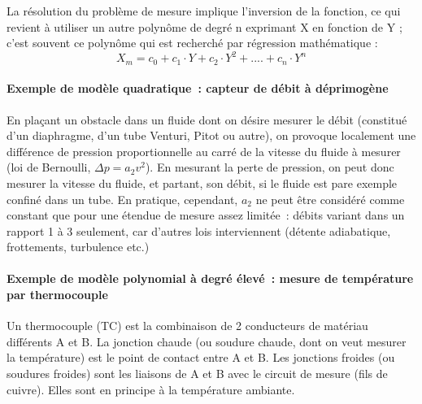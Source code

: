 La résolution du problème de mesure implique l'inversion de la fonction, ce qui revient à utiliser un autre polynôme de degré n exprimant X en fonction de Y ; c'est souvent ce polynôme qui est recherché par régression mathématique :
\begin{equation}
X_m = c_0 + c_1\cdot Y + c_2\cdot Y^2 + .... + c_n\cdot Y^n
\end{equation}

\paragraph{Exemple de modèle quadratique~: capteur de débit à déprimogène}

En plaçant un obstacle dans un fluide dont on désire mesurer le débit (constitué d'un diaphragme, d'un tube Venturi, Pitot ou autre), on provoque localement une différence de pression proportionnelle au carré de la vitesse du fluide à mesurer (loi de Bernoulli, $\Delta p=a_2v^2$). En mesurant la perte de pression, on peut donc mesurer la vitesse du fluide, et partant, son débit, si le fluide est pare exemple confiné dans un tube. En pratique, cependant, $a_2$ ne peut être considéré comme constant que pour une étendue de mesure assez limitée~: débits variant dans un rapport 1 à 3 seulement, car d'autres lois interviennent (détente adiabatique, frottements, turbulence etc.)

\paragraph{Exemple de modèle polynomial à degré élevé~: mesure de température par thermocouple}

Un thermocouple (TC) est la combinaison de 2 conducteurs de matériau différents A et B. La jonction chaude (ou soudure chaude, dont on veut mesurer la température) est le point de contact entre A et B. Les jonctions froides (ou soudures froides) sont les liaisons de A et B avec le circuit de mesure (fils de cuivre). Elles sont en principe à la température ambiante.

